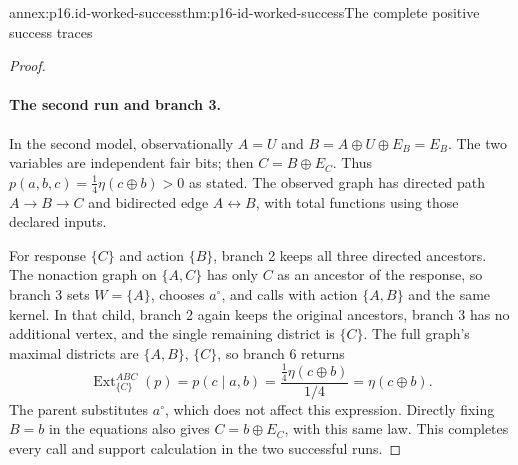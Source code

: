 \begin{annexitem}{annex:p16.id-worked-success}{thm:p16-id-worked-success}{The complete positive success traces}
\begin{proof}
\paragraph{The second run and branch 3.}
In the second model, observationally \(A=U\) and
\(B=A\oplus U\oplus E_B=E_B\). The two variables are
independent fair bits; then \(C=B\oplus E_C\). Thus
\(p(a,b,c)=\frac14\eta(c\oplus b)>0\) as stated.
The observed graph has directed path \(A\to B\to C\) and
bidirected edge \(A\leftrightarrow B\), with total functions
using those declared inputs.

For response \(\{C\}\) and action \(\{B\}\), branch 2 keeps
all three directed ancestors. The nonaction graph on \(\{A,C\}\)
has only \(C\) as an ancestor of the response, so branch 3
sets \(W=\{A\}\), chooses \(a^\circ\), and calls with action
\(\{A,B\}\) and the same kernel. In that child, branch 2
again keeps the original ancestors, branch 3 has no additional
vertex, and the single remaining district is \(\{C\}\).
The full graph's maximal districts are \(\{A,B\}\), \(\{C\}\),
so branch 6 returns
\[
 \operatorname{Ext}^{ABC}_{\{C\}}(p)
       =p(c\mid a,b)=\frac{\frac14\eta(c\oplus b)}{1/4}
       =\eta(c\oplus b).
\]
The parent substitutes \(a^\circ\), which does not affect this
expression. Directly fixing \(B=b\) in the equations also gives
\(C=b\oplus E_C\), with this same law. This completes every
call and support calculation in the two successful runs.
\end{proof}
\end{annexitem}

